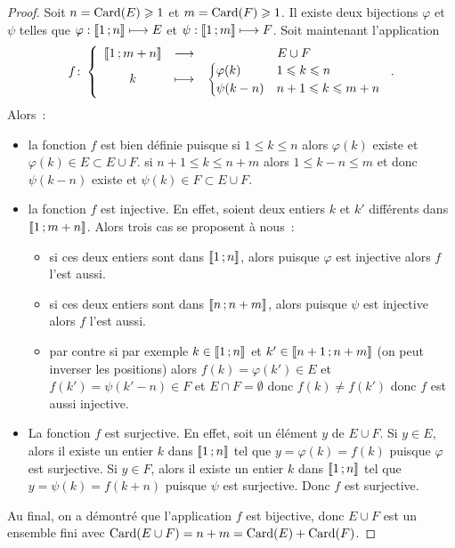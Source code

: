 \begin{proof}
  Soit $n=\operatorname{Card}(E)\geqslant 1$ et $m=\operatorname{Card}(F)\geqslant 1$. Il existe deux bijections $\varphi$ et $\psi$ telles que $\varphi:\mathopen{\llbracket}1\mathclose{}\mathpunct{};n\mathclose{\rrbracket} \longmapsto E$ et $\psi:\mathopen{\llbracket}1\mathclose{}\mathpunct{};m\mathclose{\rrbracket} \longmapsto F$. Soit maintenant l'application
  \begin{equation}
    f\colon \left\{\begin{array}{ccc} \mathopen{\llbracket}1\mathclose{}\mathpunct{};m+n\mathclose{\rrbracket} & \longrightarrow &E\cup F\\ k & \longmapsto & \begin{cases} \varphi(k) & 1\leqslant k\leqslant n \\ \psi(k-n) & n+1\leqslant k\leqslant m+n\end{cases} \end{array} \right..
  \end{equation}
  Alors~:
    \begin{itemize}
    \item la fonction $f$ est bien définie puisque si $1\leqslant k \leqslant n$ alors $\varphi(k)$ existe et $\varphi(k)\in E\subset E\cup F$. si $n+1\leqslant k \leqslant n+m$ alors $1\leqslant k-n \leqslant m$ et donc $\psi(k-n)$ existe et $\psi(k)\in F\subset E\cup F$.
    \item la fonction $f$ est injective. En effet, soient deux entiers $k$ et $k'$ différents  dans $\mathopen{\llbracket}1\mathclose{}\mathpunct{};m+n\mathclose{\rrbracket}$. Alors trois cas se proposent à nous~:
      \begin{itemize}
      \item si ces deux entiers sont dans $\mathopen{\llbracket}1\mathclose{}\mathpunct{};n\mathclose{\rrbracket}$, alors puisque $\varphi$ est injective alors $f$ l'est aussi.
      \item si ces deux entiers sont dans $\mathopen{\llbracket}n\mathclose{}\mathpunct{};n+m\mathclose{\rrbracket}$, alors puisque $\psi$ est injective alors $f$ l'est aussi.
      \item par contre si par exemple $k\in\mathopen{\llbracket}1\mathclose{}\mathpunct{};n\mathclose{\rrbracket}$ et $k'\in\mathopen{\llbracket}n+1\mathclose{}\mathpunct{};n+m\mathclose{\rrbracket}$ (on peut inverser les positions) alors $f(k)=\varphi(k')\in E$ et $f(k')=\psi(k'-n)\in F$ et $E\cap F = \emptyset$ donc $f(k)\neq f(k')$ donc $f$ est aussi injective.
      \end{itemize}
    \item La fonction $f$ est surjective. En effet, soit un élément $y$ de $E\cup F$. Si $y\in E$, alors il existe un entier $k$ dans $\mathopen{\llbracket}1\mathclose{}\mathpunct{};n\mathclose{\rrbracket}$ tel que $y=\varphi(k)=f(k)$ puisque $\varphi$ est surjective. Si $y\in F$, alors il existe un entier $k$ dans $\mathopen{\llbracket}1\mathclose{}\mathpunct{};n\mathclose{\rrbracket}$ tel que $y=\psi(k)=f(k+n)$ puisque $\psi$ est surjective. Donc $f$ est surjective.
    \end{itemize}
    Au final, on a démontré que l'application $f$ est bijective, donc $E\cup F$ est un ensemble fini avec $\operatorname{Card}(E\cup F)=n+m=\operatorname{Card}(E)+\operatorname{Card}(F)$.
  \end{proof}
